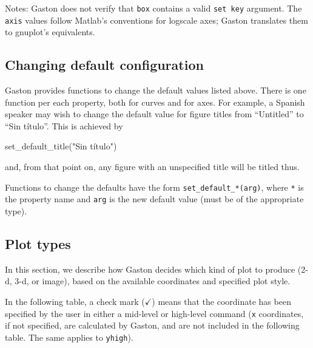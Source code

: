 \documentclass[11pt]{article}
\newcommand{\cm}{$\checkmark$}
\newcommand{\cmd}[1]{\texttt{#1}}
\begin{document}
Notes: Gaston does not verify that \cmd{box} contains a valid \cmd{set key}
argument. The \cmd{axis} values follow Matlab's conventions for logscale axes;
Gaston translates them to gnuplot's equivalents.

\subsection{Changing default configuration}

Gaston provides functions to change the default values listed above. There is
one function per each property, both for curves and for axes. For example, a
Spanish speaker may wish to change the default value for figure titles from
``Untitled'' to ``Sin título''. This is achieved by
\begin{juliacode}
set_default_title("Sin título")
\end{juliacode}
and, from that point on, any figure with an unspecified title will be titled
thus.

Functions to change the defaults have the form \cmd{set\_default\_*(arg)},
where \texttt{*} is the property name and \cmd{arg} is the new default
value (must be of the appropriate type).

\subsection{Plot types}

In this section, we describe how Gaston decides which kind of plot to produce
(2-d, 3-d, or image), based on the available coordinates and specified plot
style.

In the following table, a check mark (\cm) means that the coordinate has been
specified by the user in either a mid-level or high-level command (\cmd{x}
coordinates, if not specified, are calculated by Gaston, and are not included
in the following table. The same applies to \cmd{yhigh}).
\end{document}
